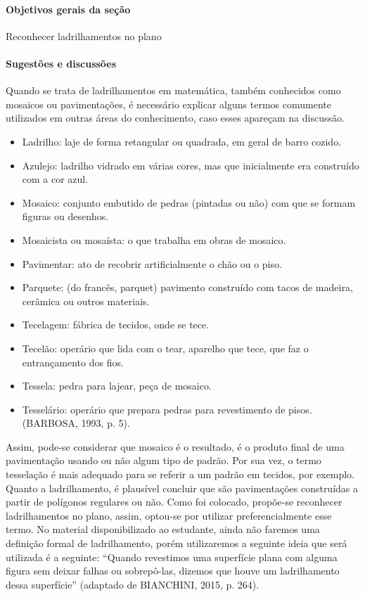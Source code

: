 \def\currentcolor{session1}
\begin{texto}
{
	\paragraph {Objetivos gerais da seção}

	Reconhecer ladrilhamentos no plano

	\paragraph {Sugestões e discussões}
	Quando se trata de ladrilhamentos em matemática, também conhecidos como mosaicos ou pavimentações, é necessário explicar alguns termos comumente utilizados em outras áreas do conhecimento, caso esses apareçam na discussão.

	\begin{itemize}
	\item Ladrilho: laje de forma retangular ou quadrada, em geral de barro cozido.
	\item Azulejo: ladrilho vidrado em várias cores, mas que inicialmente era construído com a cor azul.
	\item Mosaico: conjunto embutido de pedras (pintadas ou não) com que se formam figuras ou desenhos.
	\item Mosaicista ou mosaísta: o que trabalha em obras de mosaico.
	\item Pavimentar: ato de recobrir artificialmente o chão ou o piso.
	\item Parquete: (do francês, parquet) pavimento construído com tacos de madeira, cerâmica ou outros materiais.
	\item Tecelagem: fábrica de tecidos, onde se tece.
	\item Tecelão: operário que lida com o tear, aparelho que tece, que faz o entrançamento dos fios. 
	\item Tessela: pedra para lajear, peça de mosaico.
	\item Tesselário: operário que prepara pedras para revestimento de pisos. (BARBOSA, 1993, p. 5).
	\end{itemize}

	Assim, pode-se considerar que mosaico é o resultado, é o produto final de uma pavimentação usando ou não algum tipo de padrão. Por sua vez, o termo tesselação é mais adequado para se referir a um padrão em tecidos, por exemplo. Quanto a ladrilhamento, é plausível concluir que são pavimentações construídas a partir de  polígonos regulares ou não.  Como foi colocado, propõe-se reconhecer ladrilhamentos no plano, assim, optou-se por utilizar preferencialmente esse termo. 
	No material disponibilizado ao estudante, ainda não faremos uma definição formal de ladrilhamento, porém utilizaremos a seguinte ideia que será utilizada é a seguinte: “Quando revestimos uma superfície plana com alguma figura sem deixar falhas ou sobrepô-las, dizemos que houve um ladrilhamento dessa superfície” (adaptado de BIANCHINI, 2015, p. 264).

}
\end{texto}
